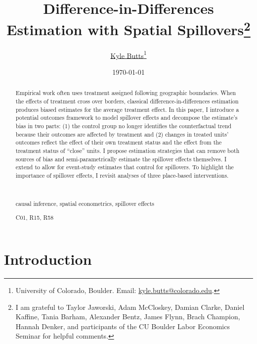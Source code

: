 \documentclass[11pt]{article}
\title{Difference-in-Differences Estimation with Spatial Spillovers\thanks{I am grateful to Taylor Jaworski, Adam McCloskey, Damian Clarke, Daniel Kaffine, Tania Barham, Alexander Bentz, James Flynn, Brach Champion, Hannah Denker, and participants of the CU Boulder Labor Economics Seminar for helpful comments.}}
\author{\href{https://kylebutts.com/}{Kyle Butts}\thanks{University of Colorado, Boulder. Email: \href{mailto:kyle.butts@colorado.edu}{kyle.butts@colorado.edu}.}}
\date{\today}
\begin{document}
\begin{titlepage}
    \maketitle
    \begin{abstract}
        Empirical work often uses treatment assigned following geographic boundaries. When the effects of treatment cross over borders, classical difference-in-differences estimation produces biased estimates for the average treatment effect. In this paper, I introduce a potential outcomes framework to model spillover effects and decompose the estimate's bias in two parts: (1) the control group no longer identifies the counterfactual trend because their outcomes are affected by treatment and (2) changes in treated units' outcomes reflect the effect of their own treatment status and the effect from the treatment status of ``close'' units. I propose estimation strategies that can remove both sources of bias and semi-parametrically estimate the spillover effects themselves. I extend \citet{Callaway_SantAnna_2020} to allow for event-study estimates that control for spillovers. To highlight the importance of spillover effects, I revisit analyses of three place-based interventions. 
        
        \par~\par
         causal inference, spatial econometrics, spillover effects
        \par
         C01, R15, R58
        \par 
    \end{abstract}
\end{titlepage}



\section{Introduction}
\end{document}
